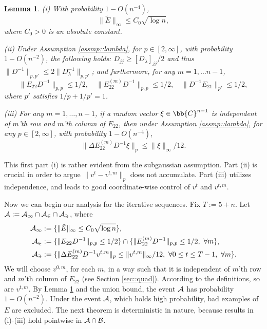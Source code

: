 \documentclass[12pt]{article}%
\theoremstyle{plain}%
\newtheorem{lem}{Lemma}[section]
\theoremstyle{remark}
\begin{document}
\begin{lem}\label{lem::indct}
(i) With probability $1 - O(n^{-4})$,
\begin{equation*}
\| \tilde{E} \|_{\infty} \le C_0 \sqrt{\log n},
\end{equation*}
where $C_0>0$ is an absolute constant. 

(ii) Under Assumption \ref{assmp::lambda}, for $p \in [2,\infty]$, with probability $1 - O(n^{-2})$, the following holds: $D_{jj} \ge [D_\lambda]_{jj}/2$ and thus $\| D^{-1} \|_{p,p'} \le 2 \| D_\lambda^{-1} \|_{p,p'}$; and furthermore, for any $m=1,\ldots n-1$,
\begin{equation}
\| E_{22} D^{-1} \|_{p,p} \le 1/2, \quad \| E_{22}^{(m)} D^{-1} \|_{p,p} \le 1/2, \quad \| D^{-1} E_{21} \|_{p'} \le 1/2, \label{ineqn::lemIndct1} 
\end{equation}
where $p'$ satisfies $1/p + 1/p' = 1$.

(iii) For any $m = 1,\ldots,n-1$, if a random vector $\xi \in \bb{C}^{n-1}$ is independent of $m$'th row and $m$'th column of $E_{22}$, then under Assumption \ref{assmp::lambda}, for any $p \in [2,\infty]$, with probability $1 - O(n^{-4})$, 
\begin{equation}\label{ineqn::sparse}
\| \Delta E_{22}^{(m)} D^{-1} \xi \|_p \le \| \xi \|_{\infty} / 12.
\end{equation}
\end{lem}

This first part (i) is rather evident from the subgaussian assumption. Part (ii) is crucial in order to argue $\|v^t - v^{t,m} \|_p$ does not accumulate. Part (iii) utilizes independence, and leads to good coordinate-wise control of $v^t$ and $v^{t,m}$. 

Now we can begin our analysis for the iterative sequences. Fix $T := 5 + n$. Let $\cal{A}:= \cal{A}_1 \cap \cal{A}_2 \cap \cal{A}_3$, where
\begin{align}
\cal{A}_1 &:= \{ \| \tilde{E} \|_{\infty} \le C_0 \sqrt{\log n} \}, \label{eqn::A1}\\
\cal{A}_2 &:= \{ \| E_{22} D^{-1} \|_{p,p} \le 1/2 \} \cap \{ \| E_{22}^{(m)} D^{-1} \|_{p,p} \le 1/2, ~ \forall m \}, \label{eqn::A2}\\
\cal{A}_3 &:=\{ \| \Delta E_{22}^{(m)} D^{-1} v^{t,m} \|_p \le \| v^{t,m} \|_\infty / 12, ~ \forall 0 \le t \le T-1, ~ \forall m \} \label{eqn::A3}.
\end{align}
We will choose $v^{0,m}$, for each $m$, in a way such that it is independent of $m$'th row and $m$'th column of $E_{22}$ (see Section \ref{sec::quad}). According to the definitions, so are $v^{t,m}$. By Lemma \ref{lem::indct} and the union bound, the event $\cal{A}$
has probability $1 - O(n^{-2})$. Under the event $\cal{A}$, which holds high probability, bad examples of $E$ are excluded. The next theorem is deterministic in nature, because results in (i)-(iii) hold pointwise in $\cal{A} \cap \cal{B}$.
\end{document}

